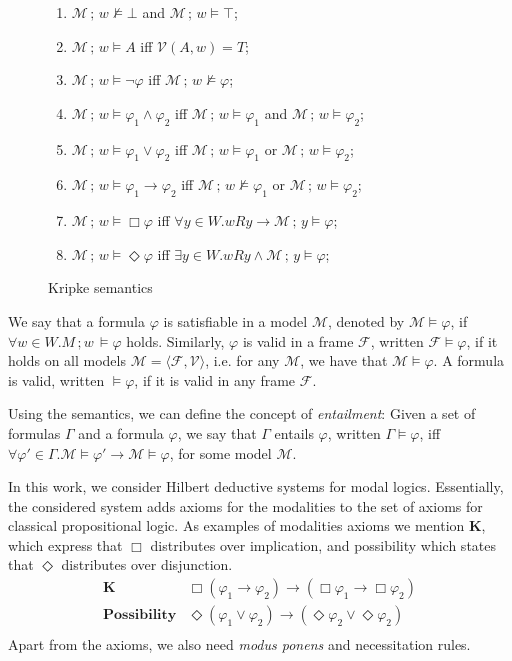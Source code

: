 \documentclass[sigconf,anonymous]{acmart}
\begin{document}
\begin{figure}[H]
\begin{enumerate}
  \item $\mathcal{M}\,;\,w\not\models \bot$ and $\mathcal{M}\,;\,w\models \top$;
  \item $\mathcal{M}\,;\,w\models A$ iff $\mathcal{V}(A,w) = T$;
  \item $\mathcal{M}\,;\,w\models \neg\varphi$ iff $\mathcal{M}\,;\,w\not\models\varphi$;
  \item $\mathcal{M}\,;\,w\models \varphi_1 \land \varphi_2$ iff
    $\mathcal{M}\,;\,w\models\varphi_1$ and $\mathcal{M}\,;\,w\models\varphi_2$;
  \item $\mathcal{M}\,;\,w\models \varphi_1 \lor \varphi_2$ iff
    $\mathcal{M}\,;\,w\models\varphi_1$ or $\mathcal{M}\,;\,w\models\varphi_2$;
  \item $\mathcal{M}\,;\,w\models \varphi_1 \to \varphi_2$ iff
    $\mathcal{M}\,;\,w\not\models\varphi_1$ or $\mathcal{M}\,;\,w\models\varphi_2$;
  \item $\mathcal{M}\,;\,w\models\Box\varphi$ iff $\forall y \in W. w R y \to \mathcal{M}\,;\,y \models\varphi$;
  \item $\mathcal{M}\,;\,w\models\Diamond\varphi$ iff $\exists y \in W. w R y \land \mathcal{M}\,;\,y \models\varphi$;
  \end{enumerate}
  \caption{Kripke semantics}
  \label{fig:kripke}
\end{figure}
We say that a formula $\varphi$ is satisfiable in a model $\mathcal{M}$,
denoted by $\mathcal{M}\models \varphi$, if $\forall w \in W. M\,;w\,\models \varphi$ holds.
Similarly, $\varphi$ is valid in a frame $\mathcal{F}$, written $\mathcal{F}\models\varphi$, if
it holds on all models $\mathcal{M} = \langle \mathcal{F},\mathcal{V}\rangle$, i.e.
for any $\mathcal{M}$, we have that $\mathcal{M}\models\varphi$. A formula
is valid, written $\models \varphi$, if it is valid in any frame $\mathcal{F}$.

Using the semantics, we can define the concept of \emph{entailment}: Given a set
of formulas $\Gamma$ and a formula $\varphi$, we say that $\Gamma$ entails
$\varphi$, written $\Gamma\models\varphi$, iff $\forall \varphi' \in\Gamma .
\mathcal{M} \models \varphi' \to \mathcal{M} \models \varphi$, for some model $\mathcal{M}$.

In this work, we consider Hilbert deductive systems for modal logics.
Essentially, the considered system adds axioms for the modalities
to the set of axioms for classical propositional logic.
As examples of modalities axioms we mention \textbf{K}, which express that $\Box$ distributes
over implication, and possibility which states that $\Diamond$ distributes
over disjunction.
\[
  \begin{array}{ll}
    \textbf{K} & \Box(\varphi_1 \to \varphi_2) \to (\Box \varphi_1 \to \Box \varphi_2)\\
    \textbf{Possibility} & \Diamond (\varphi_1 \lor \varphi_2) \to
                           (\Diamond \varphi_2 \lor \Diamond \varphi_2)\\
  \end{array}
\]
Apart from the axioms, we also need \emph{modus ponens} and necessitation rules.
\end{document}
